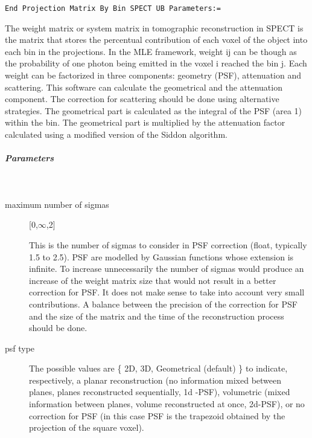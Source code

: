 \documentclass{article}
\newcommand{\subsubsubsubsection}[1]{\subparagraph{#1} \mbox{} \\}
\begin{document}
{\begin{verbatim}
End Projection Matrix By Bin SPECT UB Parameters:=
\end{verbatim}

The weight matrix or system matrix in tomographic reconstruction in SPECT is the matrix that stores the
percentual contribution of each voxel of the object into each bin in the projections. In the MLE
framework, weight ij can be though as the probability of one photon being emitted in the voxel i reached
the bin j. Each weight can be factorized in three components: geometry (PSF), attenuation and scattering.
This software can calculate the geometrical and the attenuation component. The correction for scattering
should be done using alternative strategies. The geometrical part is calculated as the integral of the
PSF (area 1) within the bin. The geometrical part is multiplied by the attenuation factor calculated
using a modified version of the Siddon algorithm.  

{ \subsubsubsubsection{Parameters}
}
\begin{description}
\item[maximum number of sigmas] [0,$\infty$,2{]}

  This is the number of sigmas to consider in PSF correction (float, typically 1.5 to 2.5). PSF are
  modelled by Gaussian functions whose extension is infinite. To increase unnecessarily the number of
  sigmas would produce an increase of the weight matrix size that would not result in a better correction
  for PSF. It does not make sense to take into account very small contributions. A balance between the
  precision of the correction for PSF and the size of the matrix and the time of the reconstruction
  process should be done.

%	

\item[psf type] 
 
  The possible values are \{ 2D, 3D, Geometrical (default) \} to indicate, respectively, a planar
  reconstruction (no information mixed between planes, planes reconstructed sequentially, 1d -PSF),
  volumetric (mixed information between planes, volume reconstructed at once, 2d-PSF), or no correction
  for PSF (in this case PSF is the trapezoid obtained by the projection of the square voxel).


\end{description}}
\end{document}
